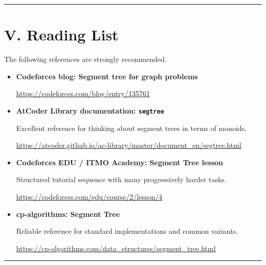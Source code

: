 \documentclass[11pt]{article}
\begin{document}
\vspace{1em}
\hrule
\vspace{1em}

\section*{V. Reading List}

The following references are strongly recommended.

\begin{itemize}
    \item \textbf{Codeforces blog: Segment tree for graph problems}

    {\small\url{https://codeforces.com/blog/entry/135761}}

    \item \textbf{AtCoder Library documentation: \texttt{segtree}}

    Excellent reference for thinking about segment trees in terms of monoids.

    {\small\url{https://atcoder.github.io/ac-library/master/document_en/segtree.html}}

    \item \textbf{Codeforces EDU / ITMO Academy: Segment Tree lesson}

    Structured tutorial sequence with many progressively harder tasks.

    {\small\url{https://codeforces.com/edu/course/2/lesson/4}}

    \item \textbf{cp-algorithms: Segment Tree}

    Reliable reference for standard implementations and common variants.

    {\small\url{https://cp-algorithms.com/data_structures/segment_tree.html}}
\end{itemize}

\vspace{1em}
\hrule
\vspace{1em}
\end{document}
